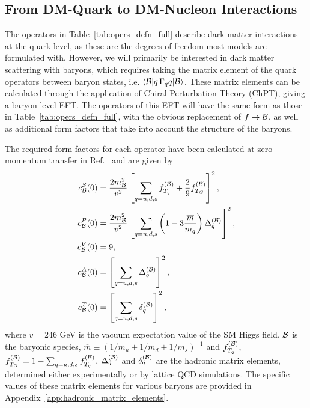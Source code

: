 \subsection{From DM-Quark to DM-Nucleon Interactions}
\label{subsec:quark_to_nucleon_EFT}

The operators in Table~\ref{tab:opers_defn_full} describe dark matter interactions at the quark level, as these are the degrees of freedom most models are formulated with. However, we will primarily be interested in dark matter scattering with baryons, which requires taking the matrix element of the quark operators between baryon states, i.e. $\langle {\cal B} | \bar q \, \Gamma_q q| {\cal B}\rangle$. These matrix elements can be calculated through the application of Chiral Perturbation Theory (ChPT), giving a baryon level EFT. The operators of this EFT will have the same form as those in Table~\ref{tab:opers_defn_full}, with the obvious replacement of $f\rightarrow \cal B$, as well as additional form factors that take into account the structure of the baryons.

The required form factors for each operator have been calculated at zero momentum transfer in Ref.~\cite{Cirelli:2013ufw_oct_Toolsmodelindependentbounds} and are given by 
\begin{align}
c_{\cal B}^S(0) &= \frac{2 m_{\cal B}^2}{v^2}\left[\sum_{q=u,d,s}f_{T_q}^{(\cal B)}+\frac{2}{9}f_{T_G}^{(\cal B)}\right]^2,\label{eq:cBS}\\
c_{\cal B}^P(0) &= \frac{2 m_{\cal B}^2}{v^2}\left[\sum_{q=u,d,s}\left(1-3\frac{\overline{m}}{m_q}\right)\Delta_q^{(\cal B)}\right]^2,\label{eq:cBP}\\
c_{\cal B}^V(0) &= 9,\label{eq:cBV}\\
c_{\cal B}^A(0) &=  \left[\sum_{q=u,d,s}\Delta_q^{(\cal B)}\right]^2,\label{eq:cBA}\\
c_{\cal B}^T(0) &= \left[\sum_{q=u,d,s}\delta_q^{(\cal B)}\right]^2,\label{eq:cBT}
\end{align}
where  $v=246$ GeV is the vacuum expectation value of the SM Higgs field, $\cal B$ is the baryonic species,  $\overline{m}\equiv(1/m_u+1/m_d+1/m_s)^{-1}$ and $f_{T_q}^{(\cal B)}$, $f_{T_G}^{(\cal B)}=1-\sum_{q=u,d,s} f_{T_q}^{(\cal B)}$, $\Delta_q^{(\cal B)}$ and $\delta_q^{(\cal B)}$ are the hadronic matrix elements, determined either experimentally or by lattice QCD simulations. The specific values of these matrix elements for various baryons are provided in Appendix~\ref{app:hadronic_matrix_elements}.

